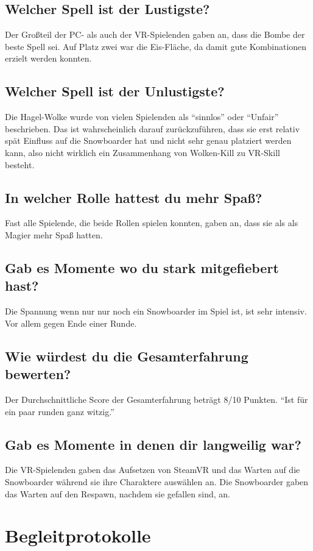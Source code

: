 \subsection{Welcher Spell ist der Lustigste?}
Der Großteil der PC- als auch der VR-Spielenden gaben an, dass die Bombe der beste Spell sei. Auf Platz zwei war die Eis-Fläche, da damit gute Kombinationen erzielt werden konnten.

\subsection{Welcher Spell ist der Unlustigste?}
Die Hagel-Wolke wurde von vielen Spielenden als "`sinnlos"' oder "`Unfair"' beschrieben. Das ist wahrscheinlich darauf zurückzuführen, dass sie erst relativ spät Einfluss auf die Snowboarder hat und nicht sehr genau platziert werden kann, also nicht wirklich ein Zusammenhang von Wolken-Kill zu VR-Skill besteht.

\subsection{In welcher Rolle hattest du mehr Spaß?}
Fast alle Spielende, die beide Rollen spielen konnten, gaben an, dass sie als als Magier mehr Spaß hatten.

\subsection{Gab es Momente wo du stark mitgefiebert hast?}
Die Spannung wenn nur nur noch ein Snowboarder im Spiel ist, ist sehr intensiv. Vor allem gegen Ende einer Runde.

\subsection{Wie würdest du die Gesamterfahrung bewerten?}
Der Durchschnittliche Score der Gesamterfahrung beträgt 8/10 Punkten. "`Ist für ein paar runden ganz witzig."'

\subsection{Gab es Momente in denen dir langweilig war?}
Die VR-Spielenden gaben das Aufsetzen von SteamVR und das Warten auf die Snowboarder während sie ihre Charaktere auswählen an. Die Snowboarder gaben das Warten auf den Respawn, nachdem sie gefallen sind, an.

%

\section{Begleitprotokolle}
%
